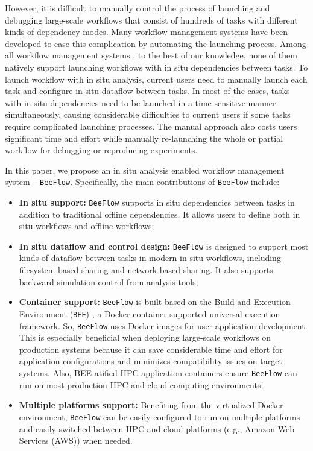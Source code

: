 However, it is difficult to manually control the process of launching and debugging large-scale workflows that consist of hundreds of tasks with different kinds of dependency modes. Many workflow management systems have been developed to ease this complication by automating the launching process. Among all workflow management systems \cite{liu2015survey, altintas2004kepler, deelman2005pegasus, ogasawara2013chiron, zhao2007swift}, to the best of our knowledge, none of them natively support launching workflows with in situ dependencies between tasks. To launch workflow with in situ analysis, current users need to manually launch each task and configure in situ dataflow between tasks. In most of the cases, tasks with in situ dependencies need to be launched in a time sensitive manner simultaneously, causing considerable difficulties to current users if some tasks require complicated launching processes. The manual approach also costs users significant time and effort while manually re-launching the whole or partial workflow for debugging or reproducing experiments.

In this paper, we propose an in situ analysis enabled workflow management system -- \texttt{BeeFlow}. Specifically, the main contributions of \texttt{BeeFlow} include:

\begin{itemize}
\item \textbf{In situ support:} \texttt{BeeFlow} supports in situ dependencies between tasks in addition to traditional offline dependencies. It allows users to define both in situ workflows \cite{sewell2015large} and offline workflows;

\item \textbf{In situ dataflow and control design:} \texttt{BeeFlow} is designed to support most kinds of dataflow between tasks in modern in situ workflows, including filesystem-based sharing and network-based sharing. It also supports backward simulation control from analysis tools;

\item \textbf{Container support:} \texttt{BeeFlow} is built based on the Build and Execution Environment (\texttt{BEE}) \cite{bee}, a Docker container supported universal execution framework. So, \texttt{BeeFlow} uses Docker images for user application development. This is especially beneficial when deploying large-scale workflows on production systems because it can save considerable time and effort for application configurations and minimizes compatibility issues on target systems. Also, BEE-atified HPC application containers ensure \texttt{BeeFlow} can run on most production HPC and cloud computing environments;
 
\item \textbf{Multiple platforms support:} Benefiting from the virtualized Docker environment, \texttt{BeeFlow} can be easily   configured to run on multiple platforms and easily switched between  HPC and cloud platforms (e.g., Amazon Web Services (AWS)) when needed.
\end{itemize}

